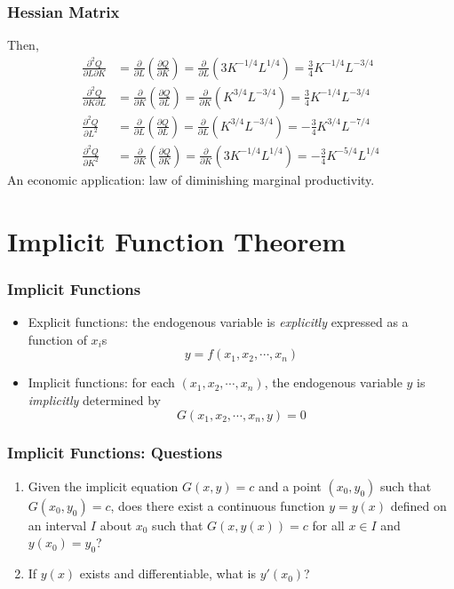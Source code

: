 \documentclass[9pt,aspectratio=169]{beamer}
\begin{document}
\begin{frame}
	\frametitle{Hessian Matrix}
	Then,
	\begin{align}
	\frac{\partial^2 Q}{\partial L\partial K} &= \frac{\partial}{\partial L} \left(\frac{\partial Q}{\partial K}\right) = \frac{\partial}{\partial L} \left(3K^{-1/4}L^{1/4}\right) = \frac{3}{4}K^{-1/4}L^{-3/4}\nonumber \\
	\frac{\partial^2 Q}{\partial K\partial L} &= \frac{\partial}{\partial K} \left(\frac{\partial Q}{\partial L}\right) = \frac{\partial}{\partial K} \left(K^{3/4}L^{-3/4}\right) = \frac{3}{4}K^{-1/4}L^{-3/4}\nonumber \\
	\frac{\partial^2 Q}{\partial L^2} &= \frac{\partial}{\partial L} \left(\frac{\partial Q}{\partial L}\right) = \frac{\partial}{\partial L} \left(K^{3/4}L^{-3/4}\right) = -\frac{3}{4}K^{3/4}L^{-7/4}\nonumber \\
	\frac{\partial^2 Q}{\partial K^2} &= \frac{\partial}{\partial K} \left(\frac{\partial Q}{\partial K}\right) = \frac{\partial}{\partial K} \left(3K^{-1/4}L^{1/4}\right) = -\frac{3}{4}K^{-5/4}L^{1/4}\nonumber 	
	\end{align}
	An economic application: law of diminishing marginal productivity. 
\end{frame}

\section{Implicit Function Theorem}

\begin{frame}
	\frametitle{Implicit Functions}
    \begin{itemize}
        \item Explicit functions: the endogenous variable is
        \emph{explicitly} expressed as a function of $x_i$s
        $$y = f(x_1,x_2,\cdots,x_n)$$
        \item Implicit functions: for each $(x_1,x_2,\cdots,x_n)$, the
        endogenous variable $y$ is \emph{implicitly} determined
        by $$G(x_1,x_2,\cdots,x_n,y) = 0$$
    \end{itemize}
\end{frame}		

\begin{frame}
	\frametitle{Implicit Functions: Questions} 
	\begin{enumerate}
		\item Given the implicit equation $G(x, y) = c$ and a point $(x_0,
        y_0)$ such that $G(x_0, y_0) = c$, does there exist a continuous
        function $y = y(x)$ defined on an interval $I$ about $x_0$ such that
        $G(x,y(x)) = c$ for all $x \in I$ and $y(x_0) = y_0$?
		\item If $y(x)$ exists and differentiable, what is $y'(x_0)$? 		
	\end{enumerate}
\end{frame}		
\end{document}

